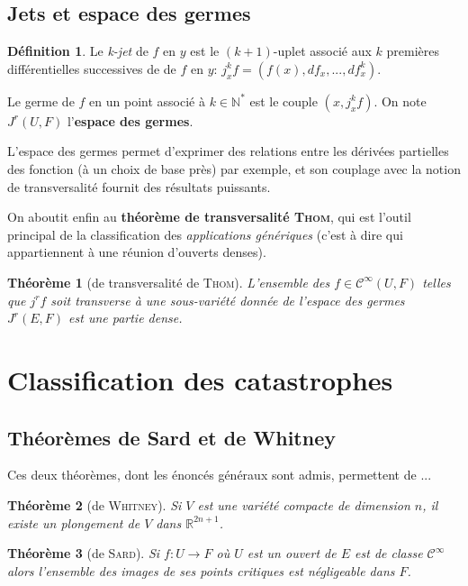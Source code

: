 \documentclass{article}
\newcommand{\cinf}{\mathcal{C}^\infty}
\newcommand{\R}{\mathbb{R}}
\newcommand{\N}{\mathbb{N}}
\newtheorem{thm}{Théorème}
\theoremstyle{definition}
\newtheorem{defn}{Définition}
\begin{document}
\subsection{Jets et espace des germes}

\begin{defn}
	Le \textit{k-jet} de $f$ en $y$ est le $(k+1)$-uplet associé aux $k$ premières différentielles successives de de $f$ en $y$: $j^k_x f = \left(f(x), df_x, ..., df^k_x\right)$.

	Le germe de $f$ en un point associé à $k\in\N^*$ est le couple $(x,j^k_x f)$. On note $J^r(U,F)$ l'\textbf{espace des germes}.
\end{defn}

L'espace des germes permet d'exprimer des relations entre les dérivées partielles des fonction (à un choix de base près) par exemple, et son couplage avec la notion de transversalité fournit des résultats puissants.

On aboutit enfin au \textbf{théorème de transversalité \textsc{Thom}}, qui est l'outil principal de la classification des \textit{applications génériques} (c'est à dire qui appartiennent à une réunion d'ouverts denses).

\begin{thm}[de transversalité de \textsc{Thom}]
	L'ensemble des $f\in\cinf(U,F)$ telles que $j^rf$ soit transverse à une sous-variété donnée de l'espace des germes $J^r(E,F)$ est une partie dense.
\end{thm}

\section{Classification des catastrophes}
\subsection{Théorèmes de Sard et de Whitney}

Ces deux théorèmes, dont les énoncés généraux sont admis, permettent de ...

\begin{thm}[de \textsc{Whitney}]
	Si $V$ est une variété compacte de dimension $n$, il existe un plongement de $V$ dans $\R^{2n+1}$.
\end{thm}

\begin{thm}[de \textsc{Sard}]
	Si $f: U\to F$ où $U$ est un ouvert de $E$ est de classe $\cinf$ alors l'ensemble des images de ses points critiques est négligeable dans $F$.
\end{thm}
\end{document}
